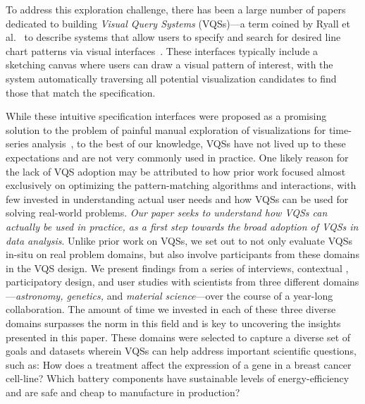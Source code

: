 To address this exploration challenge, there has been a large number of papers dedicated to building \emph{Visual Query Systems} (VQSs)---a term coined by Ryall et al.~\cite{ryall2005querylines} to describe systems that allow users to specify and search for desired line chart patterns via visual interfaces~\cite{mohebbi2011google,Hochheiser2004,wattenberg2001sketching,Siddiqui2017VLDB,ryall2005querylines,correll2016semantics,Mannino2018,Eichmann2015,Holz2009}. %
 These interfaces typically include a sketching canvas where users can draw a visual pattern of interest, with the system automatically traversing all potential visualization candidates to find those that match the specification. 
 \par While these intuitive specification interfaces were proposed as a promising solution to the problem of painful manual exploration of visualizations for time-series analysis~\cite{ryall2005querylines,wattenberg2001sketching}, to the best of our knowledge, VQSs have not lived up to these expectations and are not very commonly used in practice. One likely reason for the lack of VQS adoption may be attributed to how prior work  focused almost exclusively on optimizing the pattern-matching algorithms and interactions, with few invested in understanding actual user needs and how VQSs can be used for solving real-world problems. {\em Our paper seeks to understand how VQSs can actually be used in practice, as a first step towards the broad adoption of VQSs in data analysis}. Unlike prior work on VQSs, we set out to not only evaluate VQSs in-situ on real problem domains, but also involve participants from these domains in the VQS design. We present findings from a series of interviews, contextual , participatory design, and user studies with scientists from three different domains---{\em astronomy, genetics,} and {\em material science}---over the course of a year-long collaboration. The amount of time we invested in each of these three diverse domains surpasses the norm in this field and is key to uncovering the insights presented in this paper. These domains were selected to capture a diverse set of goals and datasets wherein VQSs can help address important scientific questions, such as: How does a treatment affect the expression of a gene in a breast cancer cell-line? Which battery components have sustainable levels of energy-efficiency and are safe and cheap to manufacture in production?
